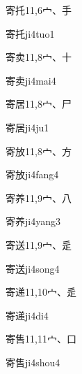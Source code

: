 \begin{Entry}{寄托}{11,6}{⼧、⼿}
  \begin{Phonetics}{寄托}{ji4tuo1}
  \end{Phonetics}
\end{Entry}

\begin{Entry}{寄卖}{11,8}{⼧、⼗}
  \begin{Phonetics}{寄卖}{ji4mai4}
  \end{Phonetics}
\end{Entry}

\begin{Entry}{寄居}{11,8}{⼧、⼫}
  \begin{Phonetics}{寄居}{ji4ju1}
  \end{Phonetics}
\end{Entry}

\begin{Entry}{寄放}{11,8}{⼧、⽅}
  \begin{Phonetics}{寄放}{ji4fang4}
  \end{Phonetics}
\end{Entry}

\begin{Entry}{寄养}{11,9}{⼧、⼋}
  \begin{Phonetics}{寄养}{ji4yang3}
  \end{Phonetics}
\end{Entry}

\begin{Entry}{寄送}{11,9}{⼧、⾡}
  \begin{Phonetics}{寄送}{ji4song4}
  \end{Phonetics}
\end{Entry}

\begin{Entry}{寄递}{11,10}{⼧、⾡}
  \begin{Phonetics}{寄递}{ji4di4}
  \end{Phonetics}
\end{Entry}

\begin{Entry}{寄售}{11,11}{⼧、⼝}
  \begin{Phonetics}{寄售}{ji4shou4}
  \end{Phonetics}
\end{Entry}

